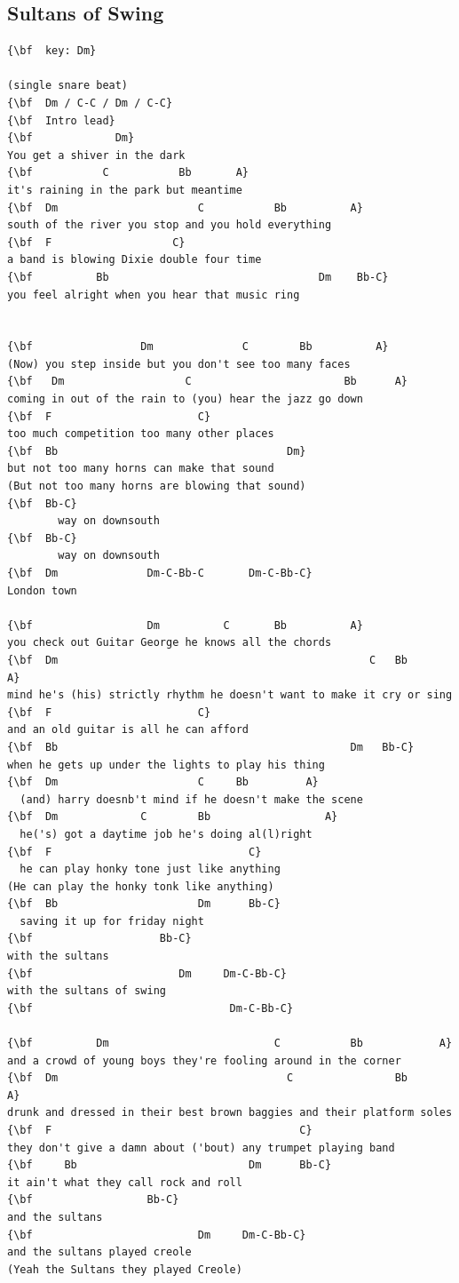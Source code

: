 \documentclass[a4paper]{article}
\begin{document}
\subsection{Sultans of Swing}
\begin{Verbatim}[commandchars=\\\{\}]
{\bf  key: Dm}

(single snare beat)
{\bf  Dm / C-C / Dm / C-C}
{\bf  Intro lead}
{\bf             Dm}
You get a shiver in the dark
{\bf           C           Bb       A}
it's raining in the park but meantime
{\bf  Dm                      C           Bb          A}
south of the river you stop and you hold everything
{\bf  F                   C}
a band is blowing Dixie double four time
{\bf          Bb                                 Dm    Bb-C}
you feel alright when you hear that music ring


{\bf                 Dm              C        Bb          A}
(Now) you step inside but you don't see too many faces
{\bf   Dm                   C                        Bb      A}
coming in out of the rain to (you) hear the jazz go down
{\bf  F                       C}
too much competition too many other places
{\bf  Bb                                    Dm}
but not too many horns can make that sound
(But not too many horns are blowing that sound)
{\bf  Bb-C}
        way on downsouth
{\bf  Bb-C}
        way on downsouth
{\bf  Dm              Dm-C-Bb-C       Dm-C-Bb-C}
London town

{\bf                  Dm          C       Bb          A}
you check out Guitar George he knows all the chords
{\bf  Dm                                                 C   Bb             A}
mind he's (his) strictly rhythm he doesn't want to make it cry or sing
{\bf  F                       C}
and an old guitar is all he can afford
{\bf  Bb                                              Dm   Bb-C}
when he gets up under the lights to play his thing
{\bf  Dm                      C     Bb         A}
  (and) harry doesnb't mind if he doesn't make the scene
{\bf  Dm             C        Bb                  A}
  he('s) got a daytime job he's doing al(l)right
{\bf  F                               C}
  he can play honky tone just like anything
(He can play the honky tonk like anything)
{\bf  Bb                      Dm      Bb-C}
  saving it up for friday night
{\bf                    Bb-C}
with the sultans
{\bf                       Dm     Dm-C-Bb-C}
with the sultans of swing
{\bf                               Dm-C-Bb-C}

{\bf          Dm                          C           Bb            A}
and a crowd of young boys they're fooling around in the corner
{\bf  Dm                                    C                Bb           A}
drunk and dressed in their best brown baggies and their platform soles
{\bf  F                                       C}
they don't give a damn about ('bout) any trumpet playing band
{\bf     Bb                           Dm      Bb-C}
it ain't what they call rock and roll
{\bf                  Bb-C}
and the sultans
{\bf                          Dm     Dm-C-Bb-C}
and the sultans played creole
(Yeah the Sultans they played Creole)


\end{Verbatim}
\end{document}
